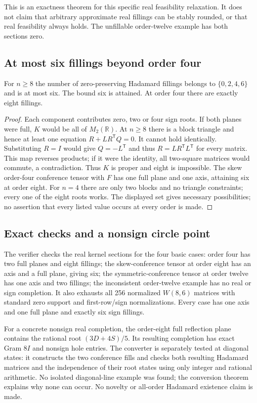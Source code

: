 This is an exactness theorem for this specific real feasibility
relaxation. It does not claim that arbitrary approximate real
fillings can be stably rounded, or that real feasibility always
holds. The unfillable order-twelve example has both sections zero.

\subsection{At most six fillings beyond order four}
\begin{proposition}
For $n\ge8$ the number of zero-preserving Hadamard fillings belongs
to $\{0,2,4,6\}$ and is at most six. The bound six is attained.
At order four there are exactly eight fillings.
\end{proposition}
\begin{proof}
Each component contributes zero, two or four sign roots. If both
planes were full, $K$ would be all of $M_2(\mathbb R)$. At $n\ge8$
there is a block triangle and hence at least one equation
$R+LR^{\mathsf T}Q=0$. It cannot hold identically. Substituting
$R=I$ would give $Q=-L^{\mathsf T}$ and thus
$R=LR^{\mathsf T}L^{\mathsf T}$ for every matrix. This map reverses
products; if it were the identity, all two-square matrices would
commute, a contradiction. Thus $K$ is proper and eight is impossible.
The skew order-four conference tensor with $F$ has one full plane
and one axis, attaining six at order eight. For $n=4$ there are
only two blocks and no triangle constraints; every one of the
eight roots works. The displayed set gives necessary possibilities;
no assertion that every listed value occurs at every order is made.
\end{proof}

\subsection{Exact checks and a nonsign circle point}
The verifier checks the real kernel sections for the four basic
cases: order four has two full planes and eight fillings; the
skew-conference tensor at order eight has an axis and a full plane,
giving six; the symmetric-conference tensor at order twelve has
one axis and two fillings; the inconsistent order-twelve example
has no real or sign completion. It also exhausts all 256 normalized
$W(8,6)$ matrices with standard zero support and first-row/sign
normalizations. Every case has one axis and one full plane and
exactly six sign fillings.

For a concrete nonsign real completion, the order-eight full
reflection plane contains the rational root $(3D+4S)/5$.
Its resulting completion has exact Gram $8I$ and nonsign hole
entries. The converter is separately tested at diagonal states:
it constructs the two conference fills and checks both resulting
Hadamard matrices and the independence of their root states using
only integer and rational arithmetic. No isolated diagonal-line
example was found; the conversion theorem explains why none can
occur. No novelty or all-order Hadamard existence claim is made.
